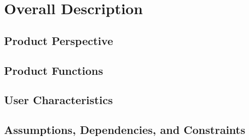 \section{Overall Description}\label{sec:overall_desc}

\subsection{Product Perspective}
\subsection{Product Functions}
\subsection{User Characteristics}
\subsection{Assumptions, Dependencies, and Constraints}